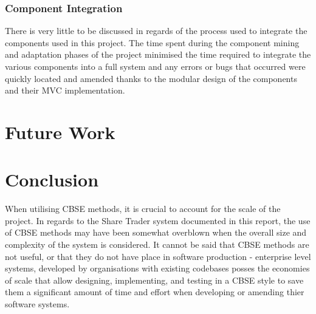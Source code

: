 \documentclass[12pt, a4paper,titlepage]{article}
\begin{document}
\subsubsection{Component Integration}
There is very little to be discussed in regards of the process used to
integrate the components used in this project. 
The time spent during the component mining and adaptation phases of the
project minimised the time required to integrate the various components into a
full system and any errors or bugs that occurred were quickly located and
amended thanks to the modular design of the components and their MVC
implementation.


\section{Future Work}



\section{Conclusion}
When utilising CBSE methods, it is crucial to account for the scale of the
project.  
In regards to the Share Trader system documented in this report, the use of
CBSE methods may have been somewhat overblown when the overall size and
complexity of the system is considered.  
It cannot be said that CBSE methods are not useful, or that they do not have
place in software production - enterprise level systems, developed by
organisations with existing codebases posses the economies of scale that allow
designing, implementing, and testing in a CBSE style to save them a
significant amount of time and effort when developing or amending thier software
systems. 


\clearpage




\appendix
\end{document}
